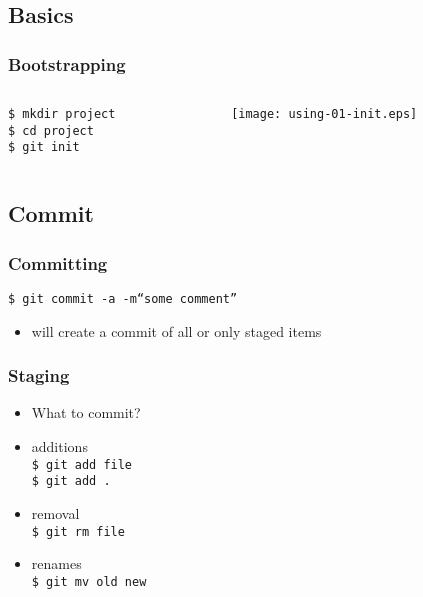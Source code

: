 \documentclass[english]{beamer}
\newcommand{\mysubsection}[2]{
  \hypertarget{#2}{}
  \subsection{#1}
  \label{#2}
}
\newcommand{\CMD}[1]{
  \texttt{\textcolor{code-green}{#1}}
}
\newcommand{\cmd}[1]{
  \texttt{\textcolor{code-orange}{#1}}
}
\newcommand{\fnt}[1]{
  \texttt{\textcolor{code-gray}{#1}}
}
\newcommand{\faint}[1]{
  \textcolor{code-gray}{#1}
}
\begin{document}
\mysubsection{Basics}{using:basics}
\begin{frame}
\frametitle{Bootstrapping}

\begin{columns}[t]
        \begin{column}[T]{.5\textwidth}
                \cmd{\$ mkdir project} \\
                \cmd{\$ cd project} \\
                \CMD{\$ git init}
        \end{column}
        \begin{column}[T]{.5\textwidth}
                \texttt{[image: using-01-init.eps]}
        \end{column}
\end{columns}
\end{frame}


\mysubsection{Commit}{using:commit}
\begin{frame}
\frametitle{Committing}

\CMD{\$ git commit \fnt{-a} -m``some comment''} \\
\begin{itemize}
        \item will create a commit of \faint{all or} only staged items
\end{itemize}
\end{frame}

\begin{frame}
\frametitle{Staging}
\begin{itemize}
        \item What to commit?

                \vspace{.1\textheight}

        \item additions \\
                \CMD{\$ git add file} \\
                \CMD{\$ git add .}

                \pause{}
                \vspace{.1\textheight}

        \item removal \\
                \CMD{\$ git rm file}

                \pause{}
                \vspace{.1\textheight}

        \item renames \\
                \CMD{\$ git mv old new}
\end{itemize}
\end{frame}
\end{document}
